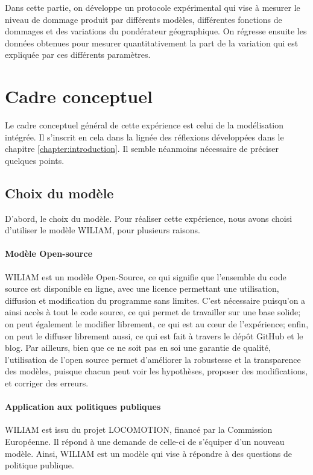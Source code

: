 Dans cette partie, on développe un protocole expérimental qui vise à mesurer le niveau de dommage produit par différents modèles, différentes fonctions de dommages et des variations du pondérateur géographique. On régresse ensuite les données obtenues pour mesurer quantitativement la part de la variation qui est expliquée par ces différents paramètres. 

\section{Cadre conceptuel}

Le cadre conceptuel général de cette expérience est celui de la modélisation intégrée. Il s'inscrit en cela dans la lignée des réflexions développées dans le chapitre \ref{chapter:introduction}. Il semble néanmoins nécessaire de préciser quelques points. \\

\subsection{Choix du modèle}

D'abord, le choix du modèle. Pour réaliser cette expérience, nous avons choisi d'utiliser le modèle WILIAM, pour plusieurs raisons. 

\paragraph{Modèle Open-source} WILIAM est un modèle Open-Source, ce qui signifie que l'ensemble du code source est disponible en ligne, avec une licence permettant une utilisation, diffusion et modification du programme sans limites. C'est nécessaire puisqu'on a ainsi accès à tout le code source, ce qui permet de travailler sur une base solide; on peut également le modifier librement, ce qui est au cœur de l'expérience; enfin, on peut le diffuser librement aussi, ce qui est fait à travers le dépôt GitHub et le blog. Par ailleurs, bien que ce ne soit pas en soi une garantie de qualité, l'utilisation de l'open source permet d'améliorer la robustesse et la transparence des modèles, puisque chacun peut voir les hypothèses, proposer des modifications, et corriger des erreurs. 

\paragraph{Application aux politiques publiques} WILIAM est issu du projet LOCOMOTION, financé par la Commission Européenne. Il répond à une demande de celle-ci de s'équiper d'un nouveau modèle. Ainsi, WILIAM est un modèle qui vise à répondre à des questions de politique publique. 

